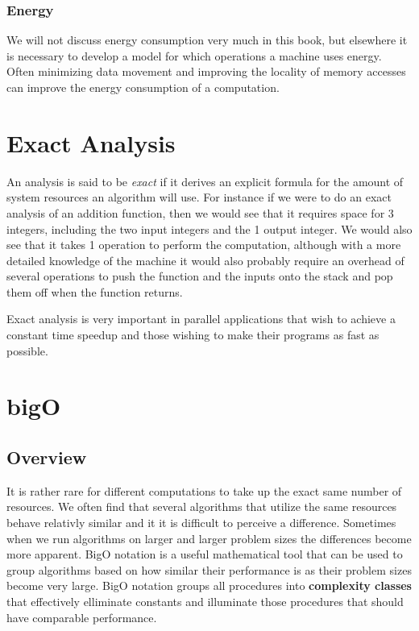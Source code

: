 \documentclass[12pt, letterpaper]{book}
\begin{document}
\subsubsection{Energy}
	We will not discuss energy consumption very much in this book, but elsewhere it is necessary to develop a model for which operations a machine uses energy. Often minimizing data movement and improving the locality of memory accesses can improve the energy consumption of a computation.

		\section{Exact Analysis}

An analysis is said to be \textit{exact} if it derives an explicit formula for the amount of system resources an algorithm will use. For instance if we were to do an exact analysis of an addition function, then we would see that it requires space for 3 integers, including the two input integers and the 1 output integer. We would also see that it takes 1 operation to perform the computation, although with a more detailed knowledge of the machine it would also probably require an overhead of several operations to push the function and the inputs onto the stack and pop them off when the function returns.

Exact analysis is very important in parallel applications that wish to achieve a constant time speedup and those wishing to make their programs as fast as possible.

\newpage

	\section{bigO} \label{bigO}
	\subsection{Overview}
	It is rather rare for different computations to take up the exact same number of resources. We often find that several algorithms that utilize the same resources behave relativly similar and it it is difficult to perceive a difference. Sometimes when we run algorithms on larger and larger problem sizes the differences become more apparent. BigO notation is a useful mathematical tool that can be used to group algorithms based on how similar their performance is as their problem sizes become very large. BigO notation groups all procedures into \textbf{complexity classes} that effectively elliminate constants and illuminate those procedures that should have comparable performance. 
\end{document}

